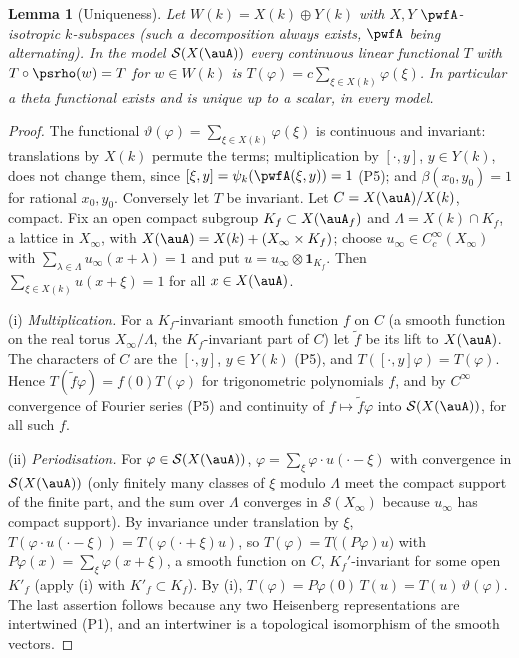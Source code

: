 \documentclass[10pt]{amsart}
\newtheorem{lemma}[theorem]{Lemma}
\theoremstyle{definition}
\theoremstyle{remark}
\providecommand{\auS}{\mathcal S}
\begin{document}
\begin{lemma}[Uniqueness]\label{pwf:unique}
Let $W(k)=X(k)\oplus Y(k)$ with $X,Y$ $\pwfA$-isotropic $k$-subspaces (such a decomposition always
exists, $\pwfA$ being alternating). In the model $\auS(X(\auA))$ every continuous linear functional
$T$ with $T\circ\psrho(w)=T$ for $w\in W(k)$ is $T(\varphi)=c\sum_{\xi\in X(k)}\varphi(\xi)$. In
particular a theta functional exists and is unique up to a scalar, in every model.
\end{lemma}
\begin{proof}
The functional $\vartheta(\varphi)=\sum_{\xi\in X(k)}\varphi(\xi)$ is continuous and invariant:
translations by $X(k)$ permute the terms; multiplication by $[\cdot,y]$, $y\in Y(k)$, does not
change them, since $[\xi,y]=\psi_k(\pwfA(\xi,y))=1$ (P5); and $\beta(x_0,y_0)=1$ for rational $x_0,
y_0$. Conversely let $T$ be invariant. Let $C=X(\auA)/X(k)$, compact. Fix an open compact subgroup
$K_f\subset X(\auA_f)$ and $\Lambda=X(k)\cap K_f$, a lattice in $X_\infty$, with $X(\auA)=X(k)+(X_\infty
\times K_f)$; choose $u_\infty\in C_c^\infty(X_\infty)$ with $\sum_{\lambda\in\Lambda}u_\infty(x+
\lambda)=1$ and put $u=u_\infty\otimes\mathbf 1_{K_f}$. Then $\sum_{\xi\in X(k)}u(x+\xi)=1$ for all
$x\in X(\auA)$.

(i) \emph{Multiplication.} For a $K_f$-invariant smooth function $f$ on $C$ (a smooth function on the
real torus $X_\infty/\Lambda$, the $K_f$-invariant part of $C$) let $\tilde f$ be its lift to
$X(\auA)$. The characters of $C$ are the $[\cdot,y]$, $y\in Y(k)$ (P5), and $T([\cdot,y]\varphi)=
T(\varphi)$. Hence $T(\tilde f\varphi)=f(0)T(\varphi)$ for trigonometric polynomials $f$, and by
$C^\infty$ convergence of Fourier series (P5) and continuity of $f\mapsto\tilde f\varphi$ into
$\auS(X(\auA))$, for all such $f$.

(ii) \emph{Periodisation.} For $\varphi\in\auS(X(\auA))$, $\varphi=\sum_{\xi}\varphi\cdot u(\cdot-\xi)$
with convergence in $\auS(X(\auA))$ (only finitely many classes of $\xi$ modulo $\Lambda$ meet the
compact support of the finite part, and the sum over $\Lambda$ converges in $\auS(X_\infty)$ because
$u_\infty$ has compact support). By invariance under translation by $\xi$,
$T(\varphi\cdot u(\cdot-\xi))=T(\varphi(\cdot+\xi)u)$, so $T(\varphi)=T\bigl((P\varphi)u\bigr)$ with
$P\varphi(x)=\sum_\xi\varphi(x+\xi)$, a smooth function on $C$, $K_f'$-invariant for some open
$K'_f$ (apply (i) with $K'_f\subset K_f$). By (i), $T(\varphi)=P\varphi(0)\,T(u)=T(u)\,\vartheta(\varphi)$.
The last assertion follows because any two Heisenberg representations are intertwined (P1), and an
intertwiner is a topological isomorphism of the smooth vectors.
\end{proof}
\end{document}
